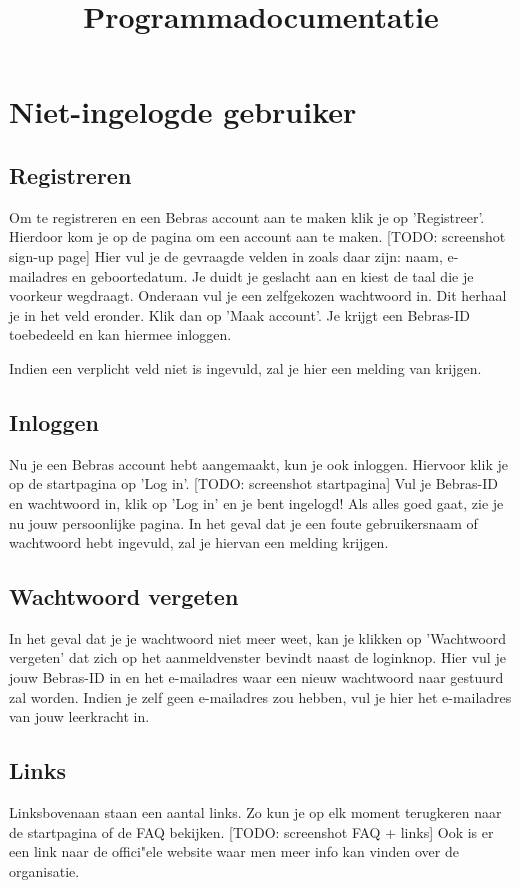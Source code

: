 \documentclass[]{article}
\title{
    Programmadocumentatie
}
\begin{document}
\maketitle

\section{Niet-ingelogde gebruiker}

\subsection{Registreren}
Om te registreren en een Bebras account aan te maken klik je op 'Registreer'. Hierdoor kom je op de pagina om een account aan te maken. [TODO: screenshot sign-up page] Hier vul je de gevraagde velden in zoals daar zijn: naam, e-mailadres en geboortedatum. Je duidt je geslacht aan en kiest de taal die je voorkeur wegdraagt. Onderaan vul je een zelfgekozen wachtwoord in. Dit herhaal je in het veld eronder. Klik dan op 'Maak account'. Je krijgt een Bebras-ID toebedeeld en kan hiermee inloggen.

Indien een verplicht veld niet is ingevuld, zal je hier een melding van krijgen. 

\subsection{Inloggen}
Nu je een Bebras account hebt aangemaakt, kun je ook inloggen. Hiervoor klik je op de startpagina op 'Log in'. [TODO: screenshot startpagina] Vul je Bebras-ID en wachtwoord in, klik op 'Log in' en je bent ingelogd! Als alles goed gaat, zie je nu jouw persoonlijke pagina. In het geval dat je een foute gebruikersnaam of wachtwoord hebt ingevuld, zal je hiervan een melding krijgen.

\subsection{Wachtwoord vergeten}
In het geval dat je je wachtwoord niet meer weet, kan je klikken op 'Wachtwoord vergeten' dat zich op het aanmeldvenster bevindt naast de loginknop. Hier vul je jouw Bebras-ID in en het e-mailadres waar een nieuw wachtwoord naar gestuurd zal worden. Indien je zelf geen e-mailadres zou hebben, vul je hier het e-mailadres van jouw leerkracht in.

\subsection{Links}
Linksbovenaan staan een aantal links. Zo kun je op elk moment terugkeren naar de startpagina of de FAQ bekijken. [TODO: screenshot FAQ + links] Ook is er een link naar de offici"ele website waar men meer info kan vinden over de organisatie.
\end{document}
